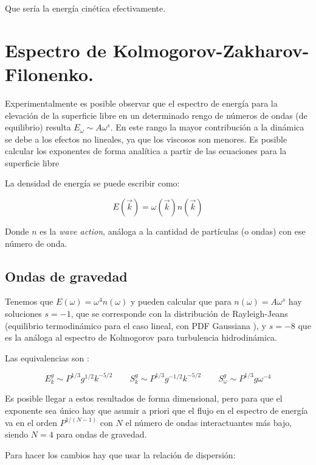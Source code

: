 Que sería la energía cinética efectivamente.


\section{Espectro de Kolmogorov-Zakharov-Filonenko.}
Experimentalmente es posible observar que el espectro de energía para la elevación de la superficie libre en un determinado rengo de números de ondas (de equilibrio) resulta $E_\omega  \sim A\omega^s$. En este rango la mayor contribución a la dinámica se debe a los efectos no lineales, ya que los viscosos son menores. Es posible calcular los exponentes de forma analítica a partir de las ecuaciones para la superficie libre \cite{zakharovEnergySpectrumStochastic1967}

La densidad de energía se puede escribir como:

\begin{equation}
	E(\vec k) = \omega(\vec k) n(\vec k)
\end{equation}  

Donde $n$ es la \textit{wave action}, análoga a la cantidad de partículas (o ondas) con ese número de onda.

\subsection*{Ondas de gravedad \cite{zakharovEnergySpectrumStochastic1967}}
Tenemos que $E(\omega)=\omega^4n(\omega)$ y pueden calcular que para $n(\omega)=A\omega^s$ hay soluciones $s=-1$, que se corresponde con la distribución de Rayleigh-Jeans (equilibrio termodinámico para el caso lineal, con PDF Gaussiana \cite{nazarenkoWaveTurbulence2011}), y $s=-8$ que es la análoga al espectro de Kolmogorov para turbulencia hidrodinámica.

Las equivalencias son \cite{falconExperimentsSurfaceGravity2022}:

\begin{equation}
	E_k^g \sim P^{1/3} g^{1/2} k^{-5/2} \qquad S_k^g \sim P^{1/3} g^{-1/2} k^{-5/2} \qquad S_\omega^g  \sim P^{1/3} g \omega^{-4}
\end{equation}  

Es posible llegar a estos resultados de forma dimensional, pero para que el exponente sea único hay que asumir a priori que el flujo en el espectro de energía va en el orden $P^{1/(N-1)}$ con $N$ el número de ondas interactuantes más bajo, siendo $N=4$ para ondas de gravedad.

Para hacer los cambios hay que usar la relación de dispersión:

